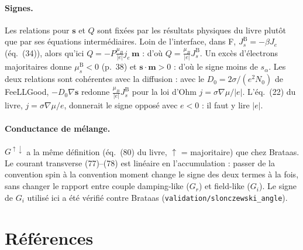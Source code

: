 \documentclass[11pt,a4paper]{article}
\newcommand{\vm}{\bm{m}}
\newcommand{\vs}{\bm{s}}
\begin{document}
\paragraph{Signes.} Les relations pour $\vs$ et $Q$ sont fixées par les
résultats physiques du livre plutôt que par ses équations
intermédiaires. Loin de l'interface, dans F, $J_s^{\mathrm{B}} = -\beta
J_e$ (éq.~(34)), alors qu'ici $Q = -P\frac{\mu_B}{|e|}j_e\,\vm$ : d'où
$Q = \frac{\mu_B}{|e|}J_s^{\mathrm{B}}$. Un excès d'électrons majoritaires
donne $\mu_s^{\mathrm{B}}<0$ (p.~38) et $\vs\cdot\vm>0$ : d'où le signe
moins de $s_\alpha$. Les deux relations sont cohérentes avec la diffusion :
avec le $D_0 = 2\sigma/(e^2N_0)$ de FeeLLGood, $-D_0\nabla\vs$ redonne
$\frac{\mu_B}{|e|}J_s^{\mathrm{B}}$ pour la loi d'Ohm
$j = \sigma\nabla\mu/|e|$. L'éq.~(22) du livre, $j = \sigma\nabla\mu/e$,
donnerait le signe opposé avec $e<0$ : il faut y lire $|e|$.

\paragraph{Conductance de mélange.} $G^{\uparrow\downarrow}$ a la même
définition (éq.~(80) du livre, $\uparrow$ = majoritaire) que chez Brataas.
Le courant transverse (77)--(78) est linéaire en l'accumulation : passer de
la convention spin à la convention moment change le signe des deux termes
à la fois, sans changer le rapport entre couple damping-like ($G_r$) et
field-like ($G_i$). Le signe de $G_i$ utilisé ici a été vérifié contre
Brataas (\texttt{validation/slonczewski\_angle}).

\section*{Références}
\end{document}
